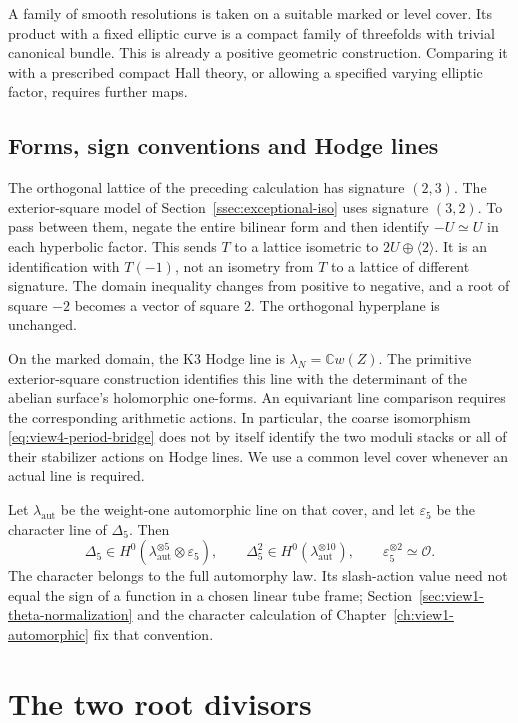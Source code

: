 A family of smooth resolutions is taken on a suitable marked or
level cover. Its product with a fixed elliptic curve is a compact
family of threefolds with trivial canonical bundle. This is already
a positive geometric construction. Comparing it with a prescribed
compact Hall theory, or allowing a specified varying elliptic
factor, requires further maps.

\subsection{Forms, sign conventions and Hodge lines}
\label{subsec:view4-volIII-lattice-convention}

The orthogonal lattice of the preceding calculation has signature
\((2,3)\). The exterior-square model of
Section~\ref{ssec:exceptional-iso} uses signature \((3,2)\).
To pass between them, negate the entire bilinear form and then
identify \(-U\simeq U\) in each hyperbolic factor. This sends
\(T\) to a lattice isometric to \(2U\oplus\langle2\rangle\).
It is an identification with \(T(-1)\), not an isometry from
\(T\) to a lattice of different signature. The domain inequality
changes from positive to negative, and a root of square \(-2\)
becomes a vector of square \(2\). The orthogonal hyperplane is
unchanged.

On the marked domain, the K3 Hodge line is
\(\lambda_N=\mathbb Cw(Z)\). The primitive exterior-square
construction identifies this line with the determinant of the
abelian surface's holomorphic one-forms. An equivariant line
comparison requires the corresponding arithmetic actions. In
particular, the coarse isomorphism
\eqref{eq:view4-period-bridge} does not by itself identify the two
moduli stacks or all of their stabilizer actions on Hodge lines.
We use a common level cover whenever an actual line is required.

Let \(\lambda_{\mathrm{aut}}\) be the weight-one automorphic line
on that cover, and let \(\varepsilon_5\) be the character line of
\(\Delta_5\). Then
\[
 \Delta_5\in H^0(\lambda_{\mathrm{aut}}^{\otimes5}
                         \otimes\varepsilon_5),\qquad
 \Delta_5^2\in H^0(\lambda_{\mathrm{aut}}^{\otimes10}),
 \qquad \varepsilon_5^{\otimes2}\simeq\mathcal O.
\]
The character belongs to the full automorphy law. Its slash-action
value need not equal the sign of a function in a chosen linear tube
frame; Section~\ref{sec:view1-theta-normalization} and the character
calculation of Chapter~\ref{ch:view1-automorphic} fix that convention.

\section{The two root divisors}
\label{subsec:view4-discriminant}

